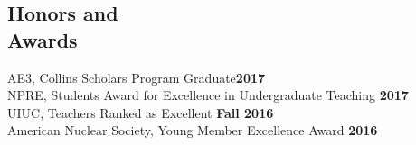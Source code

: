 \documentclass[margin,line]{resume}
\begin{document}
\begin{resume}
    \section{\mysidestyle Honors and\\Awards}
                AE3, Collins Scholars Program Graduate\hfill \textbf{2017}\vspace{.5mm}\\%
                NPRE, Students Award for Excellence in Undergraduate Teaching \hfill \textbf{2017}\vspace{.5mm}\\%
                UIUC, Teachers Ranked as Excellent \hfill \textbf{Fall 2016}\vspace{.5mm}\\%
                American Nuclear Society, Young Member Excellence Award                         
                \hfill \textbf{2016}\vspace{-2mm}
%
%

\end{resume}
\end{document}
